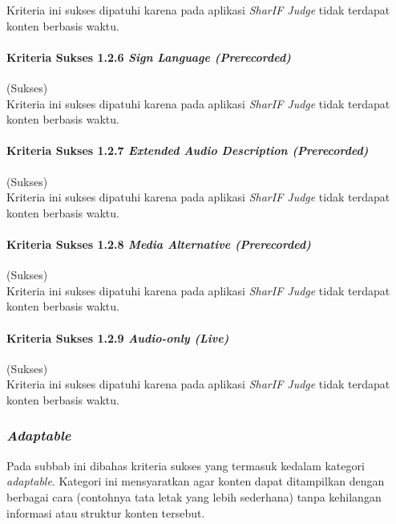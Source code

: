 Kriteria ini sukses dipatuhi karena pada aplikasi \textit{SharIF Judge} tidak terdapat konten berbasis waktu.

\paragraph{Kriteria Sukses 1.2.6 \textit{Sign Language (Prerecorded)}}
\label{subsubsec:kepatuhan_kriteria_1.2.6}
(Sukses) \\

Kriteria ini sukses dipatuhi karena pada aplikasi \textit{SharIF Judge} tidak terdapat konten berbasis waktu.

\paragraph{Kriteria Sukses 1.2.7 \textit{Extended Audio Description (Prerecorded)}}
\label{subsubsec:kepatuhan_kriteria_1.2.7}
(Sukses) \\

Kriteria ini sukses dipatuhi karena pada aplikasi \textit{SharIF Judge} tidak terdapat konten berbasis waktu.

\paragraph{Kriteria Sukses 1.2.8 \textit{Media Alternative (Prerecorded)}}
\label{subsubsec:kepatuhan_kriteria_1.2.8}
(Sukses) \\

Kriteria ini sukses dipatuhi karena pada aplikasi \textit{SharIF Judge} tidak terdapat konten berbasis waktu.

\paragraph{Kriteria Sukses 1.2.9 \textit{Audio-only (Live)}}
\label{subsubsec:kepatuhan_kriteria_1.2.9}
(Sukses) \\

Kriteria ini sukses dipatuhi karena pada aplikasi \textit{SharIF Judge} tidak terdapat konten berbasis waktu.

\subsubsection{\textit{Adaptable}}
\label{subsubsec:adaptable}

Pada subbab ini dibahas kriteria sukses yang termasuk kedalam kategori \textit{adaptable}. Kategori ini mensyaratkan agar konten dapat ditampilkan dengan berbagai cara (contohnya tata letak yang lebih sederhana) tanpa kehilangan informasi atau struktur konten tersebut.

